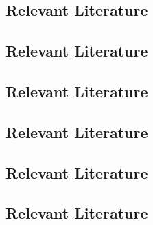 \subsection{Relevant Literature}
\begin{refsection}
\nocite{bailey2013ethics,
        bannerman1990balancing,
        berk1976effects,
        hanley1997evaluation,
        hanley2005effectiveness,
        mendonca1983effects,
        miltenberger1991assessing,
        perlmuter1973effect}
\printbibliography[heading=none]
\end{refsection}
\subsection{Relevant Literature}
\begin{refsection}
\nocite{ayllon1968token,
        baer1999plan,
        cooper2007applied,
        snell2006instruction,
        stokes1977implicit,
        stokes1989operant}
\printbibliography[heading=none]
\end{refsection}
%
\subsection{Relevant Literature}
\begin{refsection}
\nocite{cooper2007applied,
        hawkins1984meaningful,
        reimers1988parents,
        wolf1978social}
\printbibliography[heading=none]
\end{refsection}
%
\subsection{Relevant Literature}
\begin{refsection}
\nocite{cooper2007applied,
        fawcett1991social,
        wolf1978social}
\printbibliography[heading=none]
\end{refsection}
%
\subsection{Relevant Literature}
\begin{refsection}
\nocite{cooper2007applied,
        kazdin2012behavior,
        miltenberger2008behavior,
        test1990teaching}
\printbibliography[heading=none]
\end{refsection}
%
\subsection{Relevant Literature}
\begin{refsection}
\nocite{fisher2014handbook,
        noell2011building,
        shapiro2011academic}
\printbibliography[heading=none]
\end{refsection}
%
